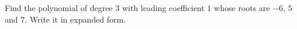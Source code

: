Find the polynomial of degree $3$ with leading coefficient $1$ whose roots are $-6$, $5$ and $7$. Write it in expanded form.
